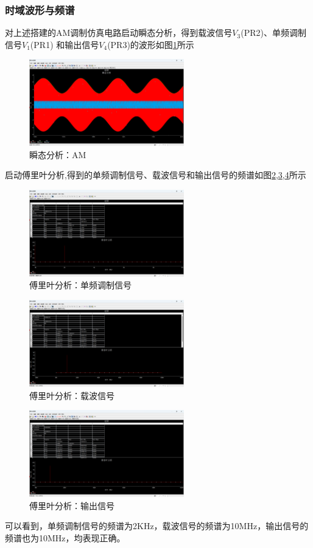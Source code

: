 \documentclass[UTF8]{ctexart}
\begin{document}
\subsubsection{时域波形与频谱}
对上述搭建的AM调制仿真电路启动瞬态分析，得到载波信号$V_3$(PR2)、单频调制信号$V_1$(PR1)
和输出信号$V_4$(PR3)的波形如图\ref{img:8}所示
\begin{figure}[htbp]
    \centering
    \includegraphics[width=0.6\textwidth]{8.png}
    \caption{瞬态分析：AM}
    \label{img:8}
\end{figure}
启动傅里叶分析,得到的单频调制信号、载波信号和输出信号的频谱如图\ref{img:9},\ref{img:10},\ref{img:11}所示
\begin{figure}[htbp]
    \centering
    \includegraphics[width=0.6\textwidth]{9.png}
    \caption{傅里叶分析：单频调制信号}
    \label{img:9}
\end{figure}
\begin{figure}[htbp]
    \centering
    \includegraphics[width=0.6\textwidth]{10.png}
    \caption{傅里叶分析：载波信号}
    \label{img:10}
\end{figure}
\begin{figure}[htbp]
    \centering
    \includegraphics[width=0.6\textwidth]{11.png}
    \caption{傅里叶分析：输出信号}
    \label{img:11}
\end{figure}
可以看到，单频调制信号的频谱为2KHz，载波信号的频谱为10MHz，输出信号的频谱也为10MHz，均表现正确。
\end{document}
